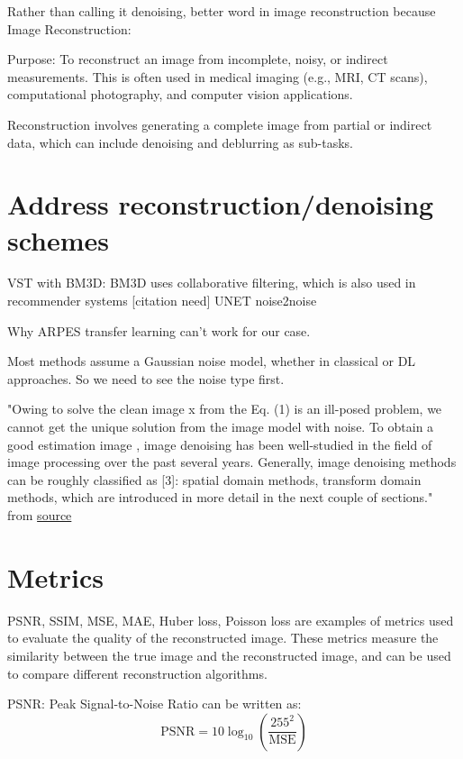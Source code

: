 Rather than calling it denoising, better word in image reconstruction because
Image Reconstruction:

Purpose: To reconstruct an image from incomplete, noisy, or indirect measurements. This is often used in medical imaging (e.g., MRI, CT scans), computational photography, and computer vision applications. 

Reconstruction involves generating a complete image from partial or indirect data, which can include denoising and deblurring as sub-tasks.

\section{Address reconstruction/denoising schemes}
VST with BM3D: BM3D uses collaborative filtering, which is also used in recommender systems [citation need]
UNET noise2noise

Why ARPES transfer learning can't work for our case.


Most methods assume a Gaussian noise model, whether in classical or DL approaches. So we need to see the noise type first.

"Owing to solve the clean image x from the Eq. (1) is an ill-posed problem, we cannot get the unique solution from the image model with noise. To obtain a good estimation image 
, image denoising has been well-studied in the field of image processing over the past several years. Generally, image denoising methods can be roughly classified as [3]: spatial domain methods, transform domain methods, which are introduced in more detail in the next couple of sections." from \href{https://vciba.springeropen.com/articles/10.1186/s42492-019-0016-7}{source}

\section{Metrics}
\gls{PSNR}, \gls{SSIM}, \gls{MSE}, \gls{MAE}, Huber loss, Poisson loss are examples of metrics used to evaluate the quality of the reconstructed image. These metrics measure the similarity between the true image and the reconstructed image, and can be used to compare different reconstruction algorithms.

PSNR: Peak Signal-to-Noise Ratio can be written as:
\begin{equation}
    \text{PSNR} = 10 \log_{10} \left( \frac{255^2}{\text{MSE}} \right)
\end{equation}

